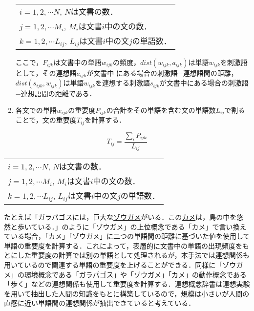 \begin{enumerate}
\begin{center}
\begin{tabular}{l}
$i = 1, 2, \cdots N$, \hspace*{1em}$N$は文書の数．\\

$j = 1, 2, \cdots M_{i}$, \hspace*{1em}$M_{i}$は文書$i$中の文の数．\\

$k = 1, 2, \cdots L_{ij}$, \hspace*{1em}$L_{ij}$は文書$i$中の文$j$の単語数．\\
\end{tabular}
\end{center}

ここで，$F_{ijk}$は文書中の単語$w_{ijk}$の頻度，$dist(w_{ijk},
a_{ijk})$は単語$w_{ijk}$を刺激語として，その連想語$a_{ijk}$が文書中
にある場合の刺激語−連想語間の距離，$dist(s_{ijk}, w_{ijk})$は単語$w_{ijk}$を連想する刺激語$s_{ijk}$が文書中にある場合の刺激語−連想語間の距離である．

\newpage

\item {各文での単語$w_{ijk}$の重要度$P_{ijk}$の合計をその単語を含む文の単語数$L_{ij}$で割ることで，文の重要度$T_{ij}$を計算する．}
\end{enumerate}


\begin{equation}
T_{ij} = \frac{\sum_{i}P_{ijk}}{L_{ij}}
\end{equation}
\begin{center}

\begin{tabular}{l}
$i = 1, 2, \cdots N$, \hspace*{1em}$N$は文書の数．\\

$j = 1, 2, \cdots M_{i}$, \hspace*{1em}$M_{i}$は文書$i$中の文の数．\\

$k = 1, 2, \cdots L_{ij}$, \hspace*{1em}$L_{ij}$は文書$i$中の文$j$の単語数．\\
\end{tabular}
\end{center}


たとえば「ガラパゴスには，巨大な\underline{ゾウガメ}がいる．この\underline{カメ}は，島の中を悠然と歩いている．」のように「ゾウガメ」の上位概念である「カメ」で言い換えている場合，「カメ」「ゾウガメ」に二つの単語間の距離に基づいた値を使用して単語の重要度を計算する．これによって，表層的に文書中の単語の出現頻度をもとにした重要度の計算では別の単語として処理されるが，本手法では連想関係も用いているので関連する単語の重要度を上げることができる．同様に「ゾウガメ」の環境概念である「ガラパゴス」や「ゾウガメ」「カメ」の動作概念である「歩く」などの連想関係も使用して重要度を計算する．連想概念辞書は連想実験を用いて抽出した人間の知識をもとに構築しているので，規模は小さいが人間の直感に近い単語間の連想関係が抽出できていると考えている．


